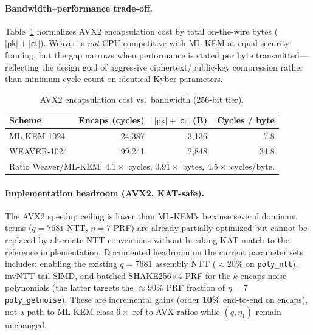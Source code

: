 \paragraph{Bandwidth--performance trade-off.}
Table~\ref{tab:bandwidth_perfc} normalizes AVX2 encapsulation cost by total
on-the-wire bytes ($|\mathsf{pk}|{+}|\mathsf{ct}|$).
Weaver is \emph{not} CPU-competitive with ML-KEM at equal security framing, but
the gap narrows when performance is stated per byte transmitted---reflecting the
design goal of aggressive ciphertext/public-key compression rather than minimum
cycle count on identical Kyber parameters.

\begin{table}[t]
\centering
\caption{AVX2 encapsulation cost vs.\ bandwidth (256-bit tier).}
\label{tab:bandwidth_perfc}
\renewcommand{\arraystretch}{1.12}
\small
\begin{tabular}{lrrr}
\toprule
\textbf{Scheme} & \textbf{Encaps (cycles)} & \textbf{$|\mathsf{pk}|{+}|\mathsf{ct}|$ (B)} &
  \textbf{Cycles / byte} \\
\midrule
ML-KEM-1024 & 24{,}387 & 3{,}136 & 7.8 \\
\textsc{WEAVER-1024} & 99{,}241 & 2{,}848 & 34.8 \\
\midrule
\multicolumn{4}{l}{\footnotesize Ratio Weaver/ML-KEM: $4.1\times$ cycles,
$0.91\times$ bytes, $4.5\times$ cycles/byte.} \\
\bottomrule
\end{tabular}
\end{table}

\paragraph{Implementation headroom (AVX2, KAT-safe).}
The AVX2 speedup ceiling is lower than ML-KEM's because several dominant terms
($q{=}7681$ NTT, $\eta{=}7$ PRF) are already partially optimized but cannot be
replaced by alternate NTT conventions without breaking KAT match to the reference
implementation.
Documented headroom on the current parameter sets includes: enabling the existing
$q{=}7681$ assembly NTT ($\approx{}20\%$ on \texttt{poly\_ntt}), invNTT tail
SIMD, and batched SHAKE256$\times$4 PRF for the $k$ encaps noise polynomials
(the latter targets the $\approx{}90\%$ PRF fraction of $\eta{=}7$ \texttt{poly\_getnoise}).
These are incremental gains (order \textbf{10\%} end-to-end on encaps), not a path to
ML-KEM-class $6\times$ ref-to-AVX ratios while $(q,\eta_1)$ remain unchanged.

